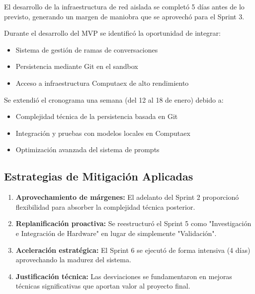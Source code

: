 \documentclass[12pt,a4paper]{article}
\begin{document}
\begin{description}[style=nextline, leftmargin=1.5cm, font=\bfseries]

    \item[Adelanto en Sprint 2 (Positivo)]
    El desarrollo de la infraestructura de red aislada se completó 5 días antes de lo previsto, generando un margen de maniobra que se aprovechó para el Sprint 3.
    
    \item[Identificación de Oportunidad Crítica (Sprint 4-5)]
    Durante el desarrollo del MVP se identificó la oportunidad de integrar:
    \begin{itemize}[leftmargin=0.5cm, label=$\circ$]
        \item Sistema de gestión de ramas de conversaciones
        \item Persistencia mediante Git en el sandbox
        \item Acceso a infraestructura Computaex de alto rendimiento
    \end{itemize}
    
    \item[Extensión Técnica del Sprint 5 (Justificada)]
    Se extendió el cronograma una semana (del 12 al 18 de enero) debido a:
    \begin{itemize}[leftmargin=0.5cm, label=$\circ$]
        \item Complejidad técnica de la persistencia basada en Git
        \item Integración y pruebas con modelos locales en Computaex
        \item Optimización avanzada del sistema de prompts
    \end{itemize}

\end{description}

\subsection{Estrategias de Mitigación Aplicadas}

\begin{enumerate}
    \item \textbf{Aprovechamiento de márgenes:} El adelanto del Sprint 2 proporcionó flexibilidad para absorber la complejidad técnica posterior.
    
    \item \textbf{Replanificación proactiva:} Se reestructuró el Sprint 5 como "Investigación e Integración de Hardware" en lugar de simplemente "Validación".
    
    \item \textbf{Aceleración estratégica:} El Sprint 6 se ejecutó de forma intensiva (4 días) aprovechando la madurez del sistema.
    
    \item \textbf{Justificación técnica:} Las desviaciones se fundamentaron en mejoras técnicas significativas que aportan valor al proyecto final.
\end{enumerate}
\end{document}
